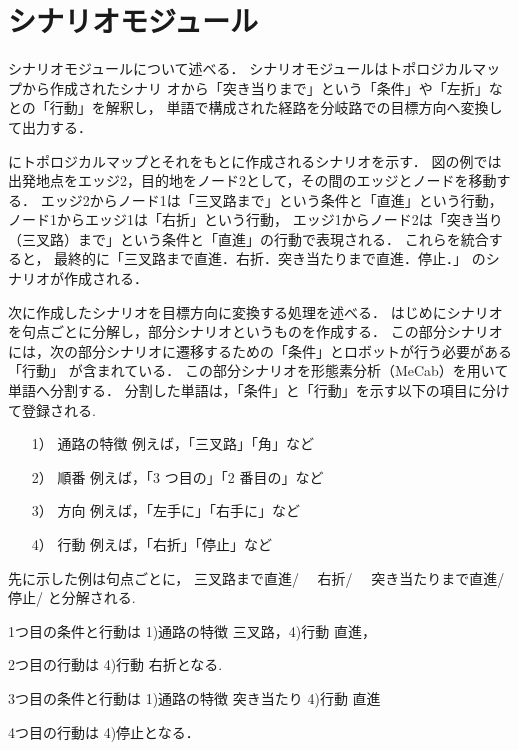 \section{シナリオモジュール}
\label{sec:scenario}
シナリオモジュールについて述べる．
シナリオモジュールはトポロジカルマップから作成されたシナリ
オから「突き当りまで」という「条件」や「左折」なとの「行動」を解釈し，
単語で構成された経路を分岐路での目標方向へ変換して出力する．

にトポロジカルマップとそれをもとに作成されるシナリオを示す．
図の例では出発地点をエッジ2，目的地をノード2として，その間のエッジとノードを移動する．
エッジ2からノード1は「三叉路まで」という条件と「直進」という行動，
ノード1からエッジ1は「右折」という行動，
エッジ1からノード2は「突き当り（三叉路）まで」という条件と「直進」の行動で表現される．
これらを統合すると，
最終的に「三叉路まで直進．右折．突き当たりまで直進．停止．」
のシナリオが作成される．

次に作成したシナリオを目標方向に変換する処理を述べる．
はじめにシナリオを句点ごとに分解し，部分シナリオというものを作成する．
この部分シナリオには，次の部分シナリオに遷移するための「条件」とロボットが行う必要がある「行動」
が含まれている．
この部分シナリオを形態素分析（MeCab\cite{2004ConditionalRF}）を用いて単語へ分割する．
分割した単語は，「条件」と「行動」を示す以下の項目に分けて登録される.
\begin{enumerate}
    \item [1）] 通路の特徴 例えば，「三叉路」「角」など
    \item [2）] 順番 例えば，「3 つ目の」「2 番目の」など 
    \item [3）] 方向 例えば，「左手に」「右手に」など
    \item [4）] 行動 例えば，「右折」「停止」など
\end{enumerate}
先に示した例は句点ごとに，
三叉路まで直進/　
右折/　  
突き当たりまで直進/　 
停止/ 
と分解される.

1つ目の条件と行動は 
1)通路の特徴 三叉路，4)行動 直進，

2つ目の行動は 4)行動 右折となる.

3つ目の条件と行動は
1)通路の特徴 突き当たり 4)行動 直進

4つ目の行動は
4)停止となる．

